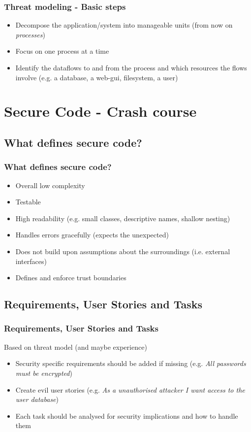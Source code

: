 \documentclass{beamer}
\begin{document}
\begin{frame}
\frametitle{Threat modeling - Basic steps}
\begin{itemize}
  \item Decompose the application/system into manageable units (from now on \textit{processes})
  \item Focus on one process at a time
  \item Identify the dataflows to and from the process and which resources the flows involve (e.g. a database, a web-gui, filesystem, a user)
  
\end{itemize}
\end{frame}

\section{Secure Code - Crash course}
\subsection{What defines secure code?}
\begin{frame}
\frametitle{What defines secure code?}
\begin{itemize}
  \item Overall low complexity
  \item Testable
  \item High readability (e.g. small classes, descriptive names, shallow nesting)
  \item Handles errors gracefully (expects the unexpected)
  \item Does not build upon assumptions about the surroundings (i.e. external interfaces)
  \item Defines and enforce trust boundaries
\end{itemize}
\end{frame}




\subsection{Requirements, User Stories and Tasks}
\begin{frame}
\frametitle{Requirements, User Stories and Tasks}
Based on threat model (and maybe experience)
\begin{itemize}
  \item Security specific requirements should be added if missing (e.g. \textit{All passwords must be encrypted})
  \item Create evil user stories (e.g. \textit{As a unauthorised attacker I want access to the user database})
  \item Each task should be analysed for security implications and how to handle them
\end{itemize}
\end{frame}
\end{document}
